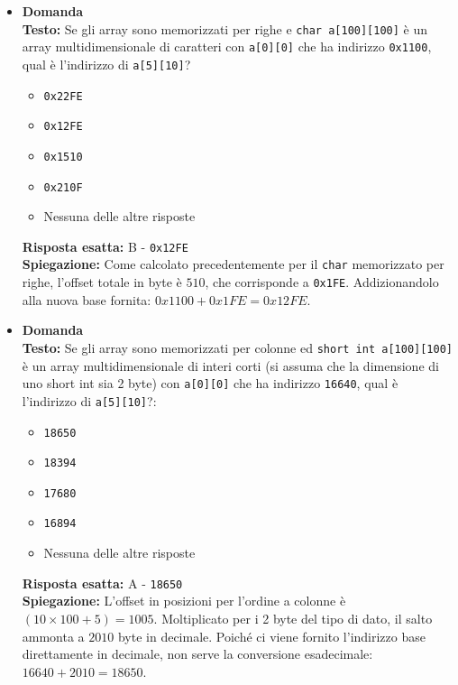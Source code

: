 \documentclass[12pt, a4paper]{article}
\newcounter{domandateoria}
\begin{document}
\begin{itemize}
    \item {}\textbf{Domanda \thedomandateoria} \\
    \textbf{Testo:} Se gli array sono memorizzati per righe e \texttt{char a[100][100]} è un array multidimensionale di caratteri con \texttt{a[0][0]} che ha indirizzo \texttt{0x1100}, qual è l'indirizzo di \texttt{a[5][10]}?
    \begin{itemize}
        \item[A)] \texttt{0x22FE}
        \item[B)] \texttt{0x12FE}
        \item[C)] \texttt{0x1510}
        \item[D)] \texttt{0x210F}
        \item[E)] Nessuna delle altre risposte
    \end{itemize}
    \textbf{Risposta esatta:} B - \texttt{0x12FE} \\
    \textbf{Spiegazione:} Come calcolato precedentemente per il \texttt{char} memorizzato per righe, l'offset totale in byte è $510$, che corrisponde a \texttt{0x1FE}. Addizionandolo alla nuova base fornita: $0x1100 + 0x1FE = 0x12FE$.
    \vspace{0.3cm}

    \item {}\textbf{Domanda \thedomandateoria} \\
    \textbf{Testo:} Se gli array sono memorizzati per colonne ed \texttt{short int a[100][100]} è un array multidimensionale di interi corti (si assuma che la dimensione di uno short int sia 2 byte) con \texttt{a[0][0]} che ha indirizzo \texttt{16640}, qual è l'indirizzo di \texttt{a[5][10]}?:
    \begin{itemize}
        \item[A)] \texttt{18650}
        \item[B)] \texttt{18394}
        \item[C)] \texttt{17680}
        \item[D)] \texttt{16894}
        \item[E)] Nessuna delle altre risposte
    \end{itemize}
    \textbf{Risposta esatta:} A - \texttt{18650} \\
    \textbf{Spiegazione:} L'offset in posizioni per l'ordine a colonne è $(10 \times 100 + 5) = 1005$. Moltiplicato per i 2 byte del tipo di dato, il salto ammonta a $2010$ byte in decimale. Poiché ci viene fornito l'indirizzo base direttamente in decimale, non serve la conversione esadecimale: $16640 + 2010 = 18650$.
    \vspace{0.3cm}
\end{itemize}
\end{document}
